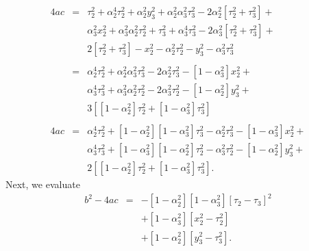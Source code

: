 \documentclass[twocolumn]{article}
\begin{document}
\begin{eqnarray}
   \nonumber
   4ac &=&
           \tau_2^2 + \alpha_2^4 \tau_2^2 + \alpha_2^2 y_3^2 + \alpha_2^2
           \alpha_3^2 \tau_3^2 - 2 \alpha_2^2 \left[\tau_2^2 + \tau_3^2\right]
           +\\
   \nonumber
   &&
           \alpha_3^2 x_2^2 + \alpha_3^2 \alpha_2^2 \tau_2^2 + \tau_3^2 +
           \alpha_3^4 \tau_3^2 - 2 \alpha_3^2 \left[\tau_2^2 + \tau_3^2\right]
           +\\
   \nonumber
   &&
           2 \left[\tau_2^2 + \tau_3^2\right] - x_2^2 - \alpha_2^2 \tau_2^2 -
           y_3^2 - \alpha_3^2 \tau_3^2\\
   \nonumber\\
   \nonumber
   &=&
           \alpha_2^4 \tau_2^2 + \alpha_2^2 \alpha_3^2 \tau_3^2 - 2 \alpha_2^2
           \tau_3^2 - \left[1 - \alpha_3^2\right] x_2^2 +\\
   \nonumber
   &&
           \alpha_3^4 \tau_3^2 + \alpha_3^2 \alpha_2^2 \tau_2^2 - 2 \alpha_3^2
           \tau_2^2 - \left[1 - \alpha_2^2\right] y_3^2 +\\
   \nonumber
   &&
           3 \left[\left[1 - \alpha_2^2\right]\tau_2^2 + \left[1 -
           \alpha_3^2\right] \tau_3^2\right]\\
   \nonumber\\
   \nonumber
   4ac &=&
           \alpha_2^4 \tau_2^2 + \left[1 - \alpha_2^2\right] \left[1 -
           \alpha_3^2\right] \tau_3^2 - \alpha_2^2\tau_3^2 - \left[1 -
           \alpha_3^2\right] x_2^2 +\\
   \nonumber
   &&
           \alpha_3^4 \tau_3^2 + \left[1 - \alpha_3^2\right] \left[1 -
           \alpha_2^2\right] \tau_2^2 - \alpha_3^2 \tau_2^2 - \left[1 -
           \alpha_2^2\right] y_3^2 +\\
   &&
           2 \left[\left[1 - \alpha_2^2\right]\tau_2^2 + \left[1 -
           \alpha_3^2\right] \tau_3^2\right].
\end{eqnarray}
Next, we evaluate
\begin{eqnarray}
   \nonumber
   b^2 - 4ac &=& - \left[1 - \alpha_2^2\right] \left[1 - \alpha_3^2\right]
                   \left[\tau_2 - \tau_3\right]^2\\
   \nonumber
              && + \left[1 - \alpha_3^2\right] \left[x_2^2 - \tau_2^2\right]\\
              && + \left[1 - \alpha_2^2\right] \left[y_3^2 - \tau_3^2\right].
\end{eqnarray}

%
%
%
%

\newpage


\end{document}
